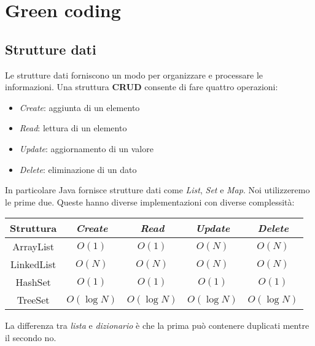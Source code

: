 \newpage
\section{Green coding}
\subsection{Strutture dati}
Le strutture dati forniscono un modo per organizzare e processare le informazioni. Una struttura \textbf{CRUD} consente di fare quattro operazioni:
\begin{itemize}
	\item \textit{Create}: aggiunta di un elemento
	\item \textit{Read}: lettura di un elemento
	\item \textit{Update}: aggiornamento di un valore
	\item \textit{Delete}: eliminazione di un dato
\end{itemize}
In particolare Java fornisce strutture dati come \textit{List}, \textit{Set} e \textit{Map}. Noi utilizzeremo le prime due. Queste hanno diverse implementazioni con diverse complessità:
\begin{table}[!h]
	\centering
	\begin{tabular}{|c|c|c|c|c|}
		\hline
		\textbf{Struttura} & \textit{Create} & \textit{Read} & \textit{Update} & \textit{Delete} \\
		\hline
		ArrayList & $O(1)$ & $O(1)$ & $O(N)$ & $O(N)$ \\
		LinkedList & $O(N)$ & $O(N)$ & $O(N)$ & $O(N)$\\
		HashSet & $O(1)$ & $O(1)$ & $O(1)$ & $O(1)$\\
		TreeSet & $O(\log N)$ & $O(\log N)$ & $O(\log N)$ & $O(\log N)$\\
		\hline
	\end{tabular}
\end{table}
\begin{note}
	La differenza tra \textit{lista} e \textit{dizionario} è che la prima può contenere duplicati mentre il secondo no.
\end{note}